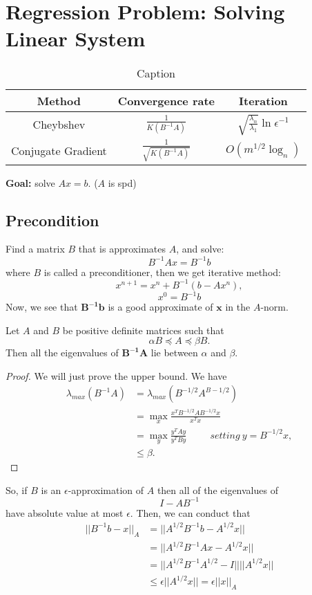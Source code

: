 \section{Regression Problem: Solving Linear System}
\begin{table}[htbp]
    \centering
    \begin{tabular}{|c|c|c|}
         Method & Convergence rate & Iteration \\
         \hline
         Cheybshev & $\frac{1}{K(B^{-1}A)}$ & $\sqrt{\frac{\lambda_{n}}{\lambda_{1}}}\ln\epsilon^{-1}$\\
         \hline
         Conjugate Gradient & $\frac{1}{\sqrt{K(B^{-1}A)}}$ & $O(m^{1/2}\log _n)$\\
         \hline
    \end{tabular}
    \caption{Caption}
    \label{tab:my_label}
\end{table}
\textbf{Goal:} solve $Ax = b$. ($A$ is spd)
\subsection{Precondition}
Find a matrix $B$ that is approximates $A$, and solve:
\[
    B^{-1}Ax = B^{-1}b
\]
where $B$ is called a preconditioner, then we get iterative method:
\[
    x^{n+1} = x^{n} + B^{-1}(b - Ax^{n}),
\]
\[
    x^{0} = B^{-1}b
\]
Now, we see that $\bm{B^{-1}b}$ is a good approximate of $\bm{x}$ in the $A$-norm.
\begin{lemma}
Let $A$ and $B$ be positive definite matrices such that
\[
    \alpha B \preceq A \preceq \beta B.
\]
Then all the eigenvalues of $\bm{B^{−1}A}$ lie between $\alpha$ and $\beta$.
\begin{proof}
We will just prove the upper bound. We have
\begin{equation*}
    \begin{aligned}
        \lambda_{max}(B^{−1}A) &=  \lambda_{max}(B^{−1/2}A^{B−1/2})\\
        &= \max_{x} \frac{x^T B^{−1/2}AB^{−1/2}x}{x^{T}x}  \\
        &= \max_{y}\frac{y^{T}Ay}{y^{T}By}  ~~~~~~~~~~~ setting \ y=B^{−1/2}x, \\
        & \leq \beta.
    \end{aligned}
\end{equation*}
\end{proof}
\end{lemma}
So, if $B$ is an $\epsilon$-approximation of $A$ then all of the eigenvalues of
\begin{equation}
    I − AB^{−1}
\end{equation}
have absolute value at most $\epsilon$.
Then, we can conduct that
\begin{equation*}
    \begin{aligned}
        ||B^{-1}b−x||_{A}&=||A^{1/2}B^{-1}b - A^{1/2}x|| \\
        &= ||A^{1/2}B^{-1}Ax - A^{1/2}x|| \\
        &= ||A^{1/2}B^{-1}A^{1/2} - I|| ||A^{1/2}x|| \\
        & \leq \epsilon ||A^{1/2}x||= \epsilon ||x||_{A}
    \end{aligned}
\end{equation*}

